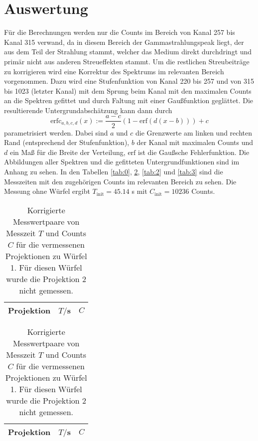 

\section{Auswertung}
Für die Berechnungen werden nur die Counts im Bereich von Kanal 257 bis Kanal 315 verwand, da in 
diesem Bereich der Gammastrahlungspeak liegt, der aus dem Teil der Strahlung stammt, welcher 
das Medium direkt durchdringt und primär nicht aus anderen Streueffekten stammt. Um die restlichen 
Streubeiträge zu korrigieren wird eine Korrektur des Spektrums im relevanten Bereich vorgenommen. 
Dazu wird eine Stufenfunktion von Kanal 220 bis 257 und von 315 bis 1023 (letzter Kanal) mit dem 
Sprung beim Kanal mit den maximalen Counts an die Spektren gefittet und durch Faltung mit einer 
Gaußfunktion geglättet. Die resultierende Untergrundabschätzung kann dann durch
\begin{equation}
\text{erfc}_{a,b,c,d}(x):=\frac{a-c}{2} \left(1-\text{erf}(d(x-b))\right)+c
\end{equation}
parametrisiert werden. Dabei sind $a$ und $c$ die Grenzwerte am linken und rechten Rand 
(entsprechend der Stufenfunktion), $b$ der Kanal mit maximalen Counts und $d$ ein Maß für die 
Breite der Verteilung, $\text{erf}$ ist die Gaußsche Fehlerfunktion. Die Abbildungen aller 
Spektren und die gefitteten Untergrundfunktionen sind im Anhang zu sehen. In den Tabellen 
\ref{tab:0}, \ref{tab:1}, \ref{tab:2} und \ref{tab:3} sind die Messzeiten mit den zugehörigen 
Counts im relevanten Bereich zu sehen. Die Messung ohne Würfel ergibt $T_\text{init}=45.14$ s mit 
$C_\text{init}=10236$ Counts.
\begin{table}
\centering
\begin{tabular}{ccc}
\toprule \midrule
Projektion &$T/$s & $C$ \\
\midrule

\midrule
\bottomrule
\end{tabular}
\caption{Korrigierte Messwertpaare von Messzeit $T$ und Counts $C$ für die vermessenen 
Projektionen zu 
Würfel 0.} \label{tab:0}

\begin{tabular}{ccc}
\toprule \midrule
Projektion &$T/$s & $C$ \\
\midrule

\midrule
\bottomrule
\end{tabular}
\caption{Korrigierte Messwertpaare von Messzeit $T$ und Counts $C$ für die vermessenen 
Projektionen zu 
Würfel 1. Für diesen Würfel wurde die Projektion 2 nicht gemessen.} \label{tab:1}
\end{table}

